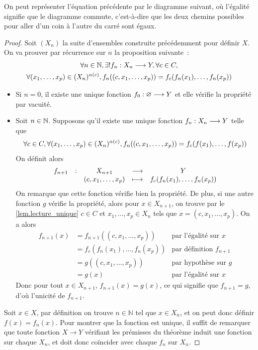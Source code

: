 On peut représenter l'équation précédente par le diagramme suivant, où l'égalité
signifie que le diagramme commute, c'est-à-dire que les deux chemins possibles
pour aller d'un coin à l'autre du carré sont égaux.

\begin{center}
\end{center}

\begin{proof}
  Soit $(X_n)$ la suite d'ensembles construite précédemment pour définir $X$. On
  va prouver par récurrence sur $n$ la proposition suivante~:
  \begin{multline*}
    \forall n\in \mathbb N, \exists ! f_n : \displaystyle X_n \longrightarrow Y, \forall c \in C,\\
    \forall (x_1,\ldots,x_p)\in (X_n)^{\alpha(c)}, f_n((c,x_1,\ldots,x_p))
    = f_c(f_n(x_1),\ldots,f_n(x_p))
  \end{multline*}
  \begin{itemize}
  \item Si $n = 0$, il existe une unique fonction $f_0 : \displaystyle \varnothing \longrightarrow Y$
    et elle vérifie la propriété par vacuité.
  \item Soit $n \in \mathbb N$. Supposons qu'il existe une unique fonction
    $f_n : \displaystyle X_n \longrightarrow Y$ telle que
    \[\forall c\in C, \forall (x_1,\ldots,x_p)\in (X_n)^{\alpha(c)},
    f_n((c,x_1,\ldots,x_p)) = f_c(f(x_1),\ldots,f(x_p))\]
    On définit alors
    \[\makeFun{f_{n+1}}{X_{n+1}}{Y}{(c,x_1,\ldots,x_p)}
              {f_c(f_n(x_1),\ldots,f_n(x_p))}\]
    On remarque que cette fonction vérifie bien la propriété. De plus, si une
    autre fonction $g$ vérifie la propriété, alors pour $x\in X_{n+1}$, on
    trouve par
    le \cref{lem.lecture_unique} $c\in C$ et $x_1,\ldots,x_p \in X_n$ tels que
    $x = (c,x_1,\ldots,x_p)$. On a alors
    \begin{align*}
      f_{n+1}(x) &= f_{n+1}((c,x_1,\ldots,x_p)) & \text{par l'égalité sur }x\\
      &= f_c(f_n(x_1),\ldots,f_n(x_p)) & \text{par définition }f_{n+1}\\
      &= g((c,x_1,\ldots,x_p))& \text{par hypothèse sur }g\\
      &= g(x) & \text{par l'égalité sur }x
    \end{align*}
    Donc pour tout $x\in X_{n+1}$, $f_{n+1}(x) = g(x)$, ce qui signifie que
    $f_{n+1} = g$, d'où l'unicité de $f_{n+1}$.
  \end{itemize}

  \noindent
  Soit $x \in X$, par définition on trouve $n\in \mathbb N$ tel que $x \in X_n$,
  et on peut donc définir $f(x) = f_n(x)$. Pour montrer que la fonction est
  unique, il suffit de remarquer que toute fonction $X \to Y$ vérifiant les
  prémisses du théorème induit une fonction sur chaque $X_n$, et doit donc
  coïncider avec chaque $f_n$ sur $X_n$.
\end{proof}

